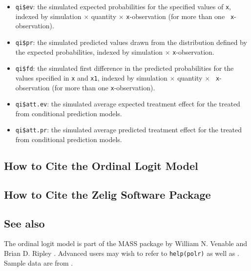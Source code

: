 \begin{itemize}
   \begin{itemize}
   \item {\tt qi\$ev}: the simulated expected probabilities for the
     specified values of {\tt x}, indexed by simulation $\times$
     quantity $\times$ {\tt x}-observation (for more than one {\tt
       x}-observation).
   \item {\tt qi\$pr}: the simulated predicted values drawn from the
     distribution defined by the expected probabilities, indexed by
     simulation $\times$ {\tt x}-observation.
   \item {\tt qi\$fd}: the simulated first difference in the predicted
     probabilities for the values specified in {\tt x} and {\tt x1},
     indexed by simulation $\times$ quantity $\times$ {\tt
       x}-observation (for more than one {\tt x}-observation).
   \item {\tt qi\$att.ev}: the simulated average expected treatment
     effect for the treated from conditional prediction models.  
   \item {\tt qi\$att.pr}: the simulated average predicted treatment
     effect for the treated from conditional prediction models.  
   \end{itemize}
\end{itemize}

\subsection*{How to Cite the Ordinal Logit Model}

\subsection*{How to Cite the Zelig Software Package}
\CiteZelig

\subsection* {See also}
The ordinal logit model is part of the MASS package by William N. Venable and Brian D. Ripley \citep{VenRip02}. Advanced users may wish to refer to \texttt{help(polr)} as well as \cite{McCNel89}. Sample data are from \cite{Martin92}.



 